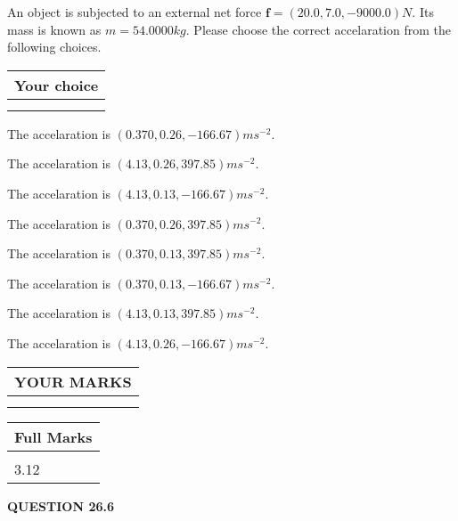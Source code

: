 \documentclass[12pt]{article}
\begin{document}
  
 
 
An object is subjected to an external net force $\mathbf{f}=
(20.0 , 7.0 , -9000.0) N$.
Its mass is known as $m= %
54.0000 kg$. Please choose the
correct accelaration from the following choices.
 
  
  
\noindent\hspace{3.0in} \begin{tabular}{|l|}
\hline
Your choice \\
\hline
 \\ 
 \\ 
\hline
\end{tabular}
  
  
 
 
The accelaration is $  %
(
0.370,
0.26,
-166.67)
ms^{-2} $.
 
 
The accelaration is $  %
(
4.13,
0.26,
397.85)
ms^{-2} $.
 
 
The accelaration is $  %
(
4.13,
0.13,
-166.67)
ms^{-2} $.
 
 
The accelaration is $  %
(
0.370,
0.26,
397.85)
ms^{-2} $.
 
 
The accelaration is $  %
(
0.370,
0.13,
397.85)
ms^{-2} $.
 
 
The accelaration is $  %
(
0.370,
0.13,
-166.67)
ms^{-2} $.
 
 
The accelaration is $  %
(
4.13,
0.13,
397.85)
ms^{-2} $.
 
 
The accelaration is $  %
(
4.13,
0.26,
-166.67)
ms^{-2} $.
 
 
 

 

 
\vspace{0.3in}
  
\vspace{0.2in}
  
\noindent\begin{tabular}{|l|}
\hline
 YOUR MARKS  \\
\hline
 \\ 
 \\ 
\hline
\end{tabular}
\hspace{0.05in} \begin{tabular}{|l|}
\hline
 Full Marks  \\
\hline
 \\ 
3.12 \\
\hline
\end{tabular}
{\textbf{\Large{QUESTION
26.6 
}}}
  
\end{document}
